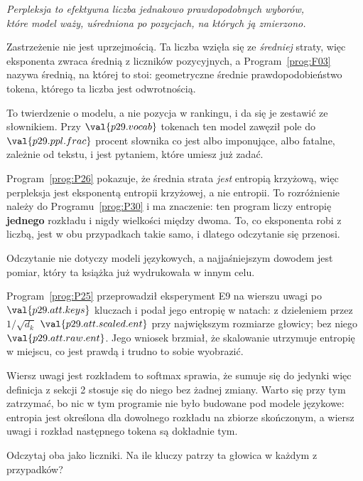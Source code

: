 \begin{fr}

\begin{center}
\emph{Perpleksja to efektywna liczba jednakowo prawdopodobnych wyborów,\\
które model waży, uśredniona po pozycjach, na których ją zmierzono.}
\end{center}

Zastrzeżenie nie jest uprzejmością. Ta liczba wzięła się ze \emph{średniej}
straty, więc eksponenta zwraca średnią z liczników pozycyjnych, a
Program~\ref{prog:F03} nazywa średnią, na której to stoi: geometryczne średnie
prawdopodobieństwo tokena, którego ta liczba jest odwrotnością.

To twierdzenie o modelu, a nie pozycja w rankingu, i da się je zestawić ze
słownikiem. Przy $\val{p29.vocab}$ tokenach ten model zawęził pole do
$\val{p29.ppl.frac}$ procent słownika \dash{} co jest albo imponujące, albo
fatalne, zależnie od tekstu, i jest pytaniem, które umiesz już zadać.

\begin{note}
Program~\ref{prog:P26} pokazuje, że średnia strata \emph{jest} entropią
krzyżową, więc perpleksja jest eksponentą entropii krzyżowej, a nie entropii.
To rozróżnienie należy do Programu~\ref{prog:P30} i ma znaczenie: ten program
liczy entropię \textbf{jednego} rozkładu i nigdy wielkości między dwoma. To,
co eksponenta robi z liczbą, jest w obu przypadkach takie samo, i dlatego
odczytanie się przenosi.
\end{note}
\end{fr}

\begin{fr}
Odczytanie nie dotyczy modeli językowych, a najjaśniejszym dowodem jest pomiar,
który ta książka już wydrukowała w innym celu.

Program~\ref{prog:P25} przeprowadził eksperyment E9 na wierszu uwagi po
$\val{p29.att.keys}$ kluczach i podał jego entropię w natach: z dzieleniem
przez $1/\sqrt{d_k}$ \dash{} $\val{p29.att.scaled.ent}$ przy
największym rozmiarze głowicy; bez niego \dash{} $\val{p29.att.raw.ent}$. Jego
wniosek brzmiał, że skalowanie utrzymuje entropię w miejscu, co jest prawdą i
trudno to sobie wyobrazić.

Wiersz uwagi jest rozkładem \dash{} to softmax sprawia, że sumuje się do
jedynki \dash{} więc definicja z sekcji 2 stosuje się do niego bez żadnej
zmiany. Warto się przy tym zatrzymać, bo nic w tym programie nie było budowane
pod modele językowe: entropia jest określona dla dowolnego rozkładu na zbiorze
skończonym, a wiersz uwagi i rozkład następnego tokena są dokładnie tym.

Odczytaj oba jako liczniki. Na ile kluczy patrzy ta głowica w każdym z
przypadków?
\dotline
\nextframe
\end{fr}

